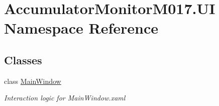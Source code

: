 \hypertarget{namespace_accumulator_monitor_m017_1_1_u_i}{}\section{Accumulator\+Monitor\+M017.\+UI Namespace Reference}
\label{namespace_accumulator_monitor_m017_1_1_u_i}
\subsection*{Classes}
\begin{DoxyCompactItemize}
\item 
class \hyperlink{class_accumulator_monitor_m017_1_1_u_i_1_1_main_window}{Main\+Window}
\begin{DoxyCompactList}\small\item\em Interaction logic for Main\+Window.\+xaml \end{DoxyCompactList}\end{DoxyCompactItemize}
